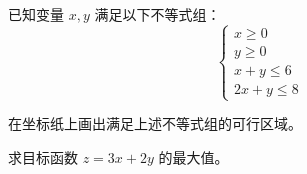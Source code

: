 \documentclass[12pt,a4paper]{exam-zh}
\newcommand{\qscore}[1]{%
    \unskip\nobreak\hfill
    \makebox[0pt][l]{\makebox[4em][r]{(#1\%)}}%
}
\begin{document}

\begin{question}[points = 10]
    已知变量 $x,y$ 满足以下不等式组：
    \[
    \begin{cases}
        x \geq 0 \\
        y \geq 0 \\
        x + y \leq 6 \\
        2x + y \leq 8
    \end{cases}
    \]

    \begin{questionparts}
        \item 在坐标纸上画出满足上述不等式组的可行区域。 \qscore{6}

        \item 求目标函数 $z = 3x + 2y$ 的最大值。 \qscore{4}
    \end{questionparts}
\end{question}
\end{document}
